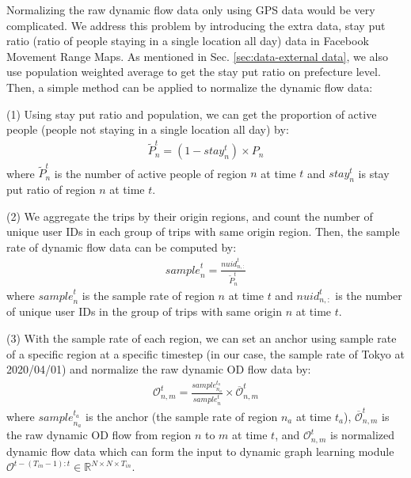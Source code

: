 \documentclass[lettersize,journal]{IEEEtran}
\begin{document}
Normalizing the raw dynamic flow data only using GPS data would be very complicated. We address this problem by introducing the extra data, stay put ratio (ratio of people staying in a single location all day) data in Facebook Movement Range Maps. As mentioned in Sec. \ref{sec:data-external data}, we also use population weighted average to get the stay put ratio on prefecture level. Then, a simple method can be applied to normalize the dynamic flow data:

(1) Using stay put ratio and population, we can get the proportion of active people (people not staying in a single location all day) by:
\begin{equation}
    \begin{aligned}
        \widetilde{P}^{t}_{n} = (1 - {stay}^{t}_{n}) \times P_n 
    \end{aligned}
\end{equation}
where $\widetilde{P}^{t}_{n}$ is the number of active people of region $n$ at time $t$ and ${stay}^{t}_{n}$ is stay put ratio of region $n$ at time $t$.

(2) We aggregate the trips by their origin regions, and count the number of unique user IDs in each group of trips with same origin region. Then, the sample rate of dynamic flow data can be computed by: 
\begin{equation}
    \begin{aligned}
        {sample}^{t}_{n} = \frac{{nuid}_{n,:}^t}{\widetilde{P}^{t}_{n}}
    \end{aligned}
\end{equation}
where ${sample}^{t}_{n}$ is the sample rate of region $n$ at time $t$ and ${{nuid}_{n,:}^t}$ is the number of unique user IDs in the group of trips with same origin $n$ at time $t$.

(3) With the sample rate of each region, we can set an anchor using sample rate of a specific region at a specific timestep (in our case, the sample rate of Tokyo at 2020/04/01) and normalize the raw dynamic OD flow data by:
\begin{equation}
    \begin{aligned}
        \mathcal{O}_{n,m}^t = \frac{{sample}^{t_a}_{n_a}}{{sample}^{t}_{n}} \times \overline{\mathcal{O}}_{n,m}^t
    \end{aligned}
\end{equation}
where ${sample}^{t_a}_{n_a}$ is the anchor (the sample rate of region $n_a$ at time $t_a$), $\overline{\mathcal{O}}_{n,m}^t$ is the raw dynamic OD flow from region $n$ to $m$ at time $t$, and $\mathcal{O}_{n,m}^t$ is normalized dynamic flow data which can form the input to dynamic graph learning module $\mathcal{O}^{t-(T_{in}-1):t} \in \mathbb{R}^{N\times N \times T_{in}}$.
\end{document}
